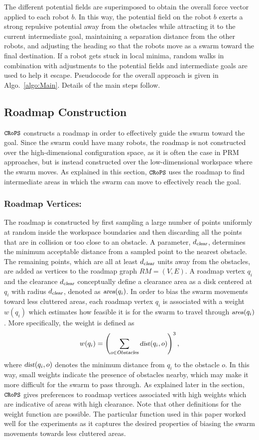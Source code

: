 \documentclass{llncs}
\newcommand{\Acronym}[1]{\ensuremath{{\small{\texttt{#1}}}}}
\newcommand{\Var}[1]{\ensuremath{{\small{\textsl{#1}}}}}
\newcommand{\Name}{\Acronym{CRoPS}}
\begin{document}
The different potential fields are superimposed to obtain the overall
force vector applied to each robot $b$. In this way, the potential
field on the robot $b$ exerts a strong repulsive potential away from
the obstacles while attracting it to the current intermediate goal,
maintaining a separation distance from the other robots, and adjusting
the heading so that the robots move as a swarm toward the final
destination. If a robot gets stuck in local minima, random walks in
combination with adjustments to the potential fields and intermediate
goals are used to help it escape.  Pseudocode for the
overall approach is given in Algo.~\ref{algo:Main}. Details of the
main steps follow.

\subsection{Roadmap Construction}
\label{sec:RM}

 $\Name$ constructs a roadmap in order to effectively guide the swarm
toward the goal. Since the swarm could have many robots, the roadmap
is not constructed over the high-dimensional configuration
space, as it is often the case in PRM approaches, but is instead
constructed over the low-dimensional workspace where the swarm
moves. As explained in this section, $\Name$ uses the roadmap to find
intermediate areas in which the swarm can move to effectively reach
the goal.

\subsubsection{Roadmap Vertices:}
The roadmap is constructed by first sampling a large number of points
uniformly at random inside the workspace boundaries and then
discarding all the points that are in collision or too close to an
obstacle. A parameter, $d_\Var{clear}$, determines the minimum
acceptable distance from a sampled point to the nearest obstacle. The
remaining points, which are all at least $d_\Var{clear}$ units away
from the obstacles, are added as vertices to the roadmap graph $RM =
(V, E)$. A roadmap vertex $q_i$ and the clearance $d_\Var{clear}$
conceptually define a clearance area as a disk centered at $q_i$ with
radius $d_\Var{clear}$, denoted as $\Var{area}(q_i)$. In order to bias
the swarm movements toward less cluttered areas, each roadmap vertex
$q_i$ is associated with a weight $w(q_i)$ which estimates how
feasible it is for the swarm to travel through $\Var{area}(q_i)$. More
specifically, the weight is defined as
$$
w(q_i) = \left(\sum_{o \in \Var{Obstacles}} \Var{dist}(q_i, o)\right)^3,
$$ where $\Var{dist}(q_i, o)$ denotes the minimum distance from $q_i$
to the obstacle $o$. In this way, small weights indicate the presence
of obstacles nearby, which may make it more difficult for the swarm to
pass through.  As explained later in the section, $\Name$ gives
preferences to roadmap vertices associated with high weights which are
indicative of areas with high clearance. Note that other definitions
for the weight function are possible. The particular function used in
this paper worked well for the experiments as it captures the desired
properties of biasing the swarm movements towards less cluttered
areas.
\end{document}
